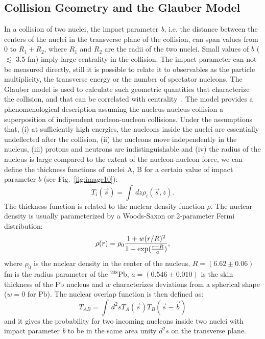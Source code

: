 \subsection{Collision Geometry and the Glauber Model}
In a collision of two nuclei, the impact parameter \textit{b}, i.e. the distance between the centers of the nuclei in the transverse plane of the collision, can span values from 0 to $R_1+R_2$, where  $R_1$ and  $R_2$ are the radii of the two nuclei. Small values of $b$ ($\lesssim$ 3.5 fm) imply large centrality in the collision. The impact parameter can not be measured directly, still it is possible to relate it to observables as the particle multiplicity, the transverse energy or the number of spectator nucleons. 
The Glauber model is used to calculate such geometric quantities that characterize the collision, and that can be correlated with centrality~\cite{Miller:2007ri}.
The model provides a phenomenological description assuming the nucleus-nucleus collision a superposition of indipendent nucleon-nucleon collisions.
Under the assumptions that, (i) at sufficiently high energies, the nucleons inside the nuclei are essentially undeflected after the collision, (ii) the nucleons move independently in the nucleus, (iii) protons and neutrons are indistinguishable and (iv) the radius of the nucleus is large compared to the extent of the nucleon-nucleon force, we can define the thickness functions of nuclei A, B for a certain value of impact parameter $b$ (see Fig.~\ref{fig:image10}):
\begin{equation}
T_i(\vec s) = \int\,dz \rho_i(\vec s,z).
\end{equation}
The thickness function is related to the nuclear density function $\rho$. The nuclear density is usually parameterized by a Woods-Saxon or 2-parameter Fermi distribution:
\begin{equation}
\rho (r) = \rho_0 \frac{1+w(r/R)^2}{1+{\rm exp}(\frac{r-R}{a})},
\end{equation}
where $\rho_0$ is the nuclear density in the center of the nucleus, $R = (6.62 \pm 0.06)$ fm is the radius parameter of the ${}^{208}$Pb, $a = (0.546 \pm 0.010)$ is the skin thickness of the Pb nucleus and $w$ characterizes deviations from a spherical shape ($w=0$ for Pb). The nuclear overlap function is then defined as:
\begin{equation}
T_{AB} = \int \,d^2s T_A(\vec s)T_B(\vec s - \vec b)
\end{equation}
and it gives the probability for two incoming nucleons inside two nuclei with impact parameter \textit{b} to be in the same area unity $d^2s$ on the transverse plane.
